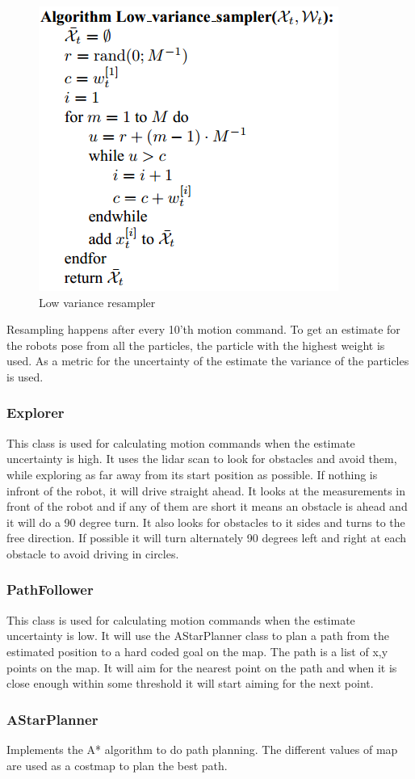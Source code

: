 \begin{figure}[H]
\centering
\includegraphics[scale=0.40]{images/low_variance_resampler}
\caption{Low variance resampler}
\label{fig:diagram}
\end{figure}

Resampling happens after every 10'th motion command.
To get an estimate for the robots pose from all the particles, the particle with the highest weight is used.
As a metric for the uncertainty of the estimate the variance of the particles is used.

\subsubsection{Explorer}
This class is used for calculating motion commands when the estimate uncertainty is high.
It uses the lidar scan to look for obstacles and avoid them, while exploring as far away from its start position as possible.
If nothing is infront of the robot, it will drive straight ahead.
It looks at the measurements in front of the robot and if any of them are short it means an obstacle is ahead and it will do a 90 degree turn. 
It also looks for obstacles to it sides and turns to the free direction.
If possible it will turn alternately 90 degrees left and right at each obstacle to avoid driving in circles. 

\subsubsection{PathFollower}
This class is used for calculating motion commands when the estimate uncertainty is low.
It will use the AStarPlanner class to plan a path from the estimated position to a hard coded goal on the map.
The path is a list of x,y points on the map.
It will aim for the nearest point on the path and when it is close enough within some threshold it will start aiming for the next point.

\subsubsection{AStarPlanner}
Implements the A* algorithm to do path planning. The different values of map are used as a costmap to plan the best path.

